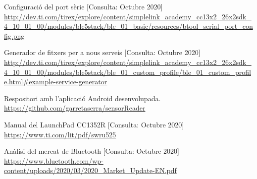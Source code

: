 \begin{thebibliography}{2}
Configuració del port sèrie
[Consulta: Octubre 2020] \newline
\href{http://dev.ti.com/tirex/explore/content/simplelink_academy_cc13x2_26x2sdk_4_10_01_00/modules/ble5stack/ble_01\_basic/resources/btool_serial_port_config.png}{http://dev.ti.com/tirex/explore/content/simplelink\_academy\_cc13x2\_26x2sdk\_4\_10\_01\_00/modules/ble5stack/ble\_01\_basic/resources/btool\_serial\_port\_config.png}

Generador de fitxers per a nous serveis 
[Consulta: Octubre 2020] \newline
\href{http://dev.ti.com/tirex/explore/content/simplelink\_academy\_cc13x2\_26x2sdk\_4\_10\_01\_00/modules/ble5stack/ble\_01\_custom\_profile/ble\_01\_custom\_profile.html\#example-service-generator}{http://dev.ti.com/tirex/explore/content/simplelink\_academy\_cc13x2\_26x2sdk\_4\_10\_01\_00/modules/ble5stack/ble\_01\_custom\_profile/ble\_01\_custom\_profile.html\#example-service-generator}

Respositori amb l'aplicació Android desenvolupada. \newline
\href{https://github.com/garretaserra/sensorReader}{https://github.com/garretaserra/sensorReader}

Manual del LaunchPad CC1352R
[Consulta: Octubre 2020] \newline
\href{https://www.ti.com/lit/pdf/swru525}{https://www.ti.com/lit/pdf/swru525}

Anàlisi del mercat de Bluetooth
[Consulta: Octubre 2020] \newline
\href{https://www.bluetooth.com/wp-content/uploads/2020/03/2020\_Market\_Update-EN.pdf}{https://www.bluetooth.com/wp-content/uploads/2020/03/2020\_Market\_Update-EN.pdf}

\end{thebibliography}